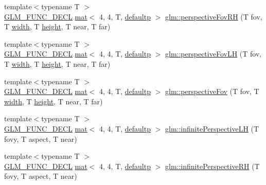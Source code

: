 \begin{DoxyCompactItemize}
\item 
{\footnotesize template$<$typename T $>$ }\\\hyperlink{setup_8hpp_ab2d052de21a70539923e9bcbf6e83a51}{G\+L\+M\+\_\+\+F\+U\+N\+C\+\_\+\+D\+E\+CL} \hyperlink{structglm_1_1mat}{mat}$<$ 4, 4, T, \hyperlink{namespaceglm_a36ed105b07c7746804d7fdc7cc90ff25a9d21ccd8b5a009ec7eb7677befc3bf51}{defaultp} $>$ \hyperlink{group__gtc__matrix__transform_gaf32bf563f28379c68554a44ee60c6a85}{glm\+::perspective\+Fov\+RH} (T fov, T \hyperlink{_s_d_l__opengl_8h_a9a82cf3caff84cabc4598e2619faac17}{width}, T \hyperlink{_s_d_l__opengl_8h_aa352f2804b9902ac30769c00dde75d5f}{height}, T near, T far)
\item 
{\footnotesize template$<$typename T $>$ }\\\hyperlink{setup_8hpp_ab2d052de21a70539923e9bcbf6e83a51}{G\+L\+M\+\_\+\+F\+U\+N\+C\+\_\+\+D\+E\+CL} \hyperlink{structglm_1_1mat}{mat}$<$ 4, 4, T, \hyperlink{namespaceglm_a36ed105b07c7746804d7fdc7cc90ff25a9d21ccd8b5a009ec7eb7677befc3bf51}{defaultp} $>$ \hyperlink{group__gtc__matrix__transform_ga6aebe16c164bd8e52554cbe0304ef4aa}{glm\+::perspective\+Fov\+LH} (T fov, T \hyperlink{_s_d_l__opengl_8h_a9a82cf3caff84cabc4598e2619faac17}{width}, T \hyperlink{_s_d_l__opengl_8h_aa352f2804b9902ac30769c00dde75d5f}{height}, T near, T far)
\item 
{\footnotesize template$<$typename T $>$ }\\\hyperlink{setup_8hpp_ab2d052de21a70539923e9bcbf6e83a51}{G\+L\+M\+\_\+\+F\+U\+N\+C\+\_\+\+D\+E\+CL} \hyperlink{structglm_1_1mat}{mat}$<$ 4, 4, T, \hyperlink{namespaceglm_a36ed105b07c7746804d7fdc7cc90ff25a9d21ccd8b5a009ec7eb7677befc3bf51}{defaultp} $>$ \hyperlink{group__gtc__matrix__transform_gaebd02240fd36e85ad754f02ddd9a560d}{glm\+::perspective\+Fov} (T fov, T \hyperlink{_s_d_l__opengl_8h_a9a82cf3caff84cabc4598e2619faac17}{width}, T \hyperlink{_s_d_l__opengl_8h_aa352f2804b9902ac30769c00dde75d5f}{height}, T near, T far)
\item 
{\footnotesize template$<$typename T $>$ }\\\hyperlink{setup_8hpp_ab2d052de21a70539923e9bcbf6e83a51}{G\+L\+M\+\_\+\+F\+U\+N\+C\+\_\+\+D\+E\+CL} \hyperlink{structglm_1_1mat}{mat}$<$ 4, 4, T, \hyperlink{namespaceglm_a36ed105b07c7746804d7fdc7cc90ff25a9d21ccd8b5a009ec7eb7677befc3bf51}{defaultp} $>$ \hyperlink{group__gtc__matrix__transform_ga3201b30f5b3ea0f933246d87bfb992a9}{glm\+::infinite\+Perspective\+LH} (T fovy, T aspect, T near)
\item 
{\footnotesize template$<$typename T $>$ }\\\hyperlink{setup_8hpp_ab2d052de21a70539923e9bcbf6e83a51}{G\+L\+M\+\_\+\+F\+U\+N\+C\+\_\+\+D\+E\+CL} \hyperlink{structglm_1_1mat}{mat}$<$ 4, 4, T, \hyperlink{namespaceglm_a36ed105b07c7746804d7fdc7cc90ff25a9d21ccd8b5a009ec7eb7677befc3bf51}{defaultp} $>$ \hyperlink{group__gtc__matrix__transform_ga99672ffe5714ef478dab2437255fe7e1}{glm\+::infinite\+Perspective\+RH} (T fovy, T aspect, T near)

\end{DoxyCompactItemize}
